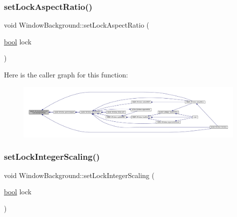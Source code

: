 \subsubsection{\texorpdfstring{set\+Lock\+Aspect\+Ratio()}{setLockAspectRatio()}}
{\footnotesize\ttfamily void Window\+Background\+::set\+Lock\+Aspect\+Ratio (\begin{DoxyParamCaption}\item[{\mbox{\hyperlink{libretro_8h_a4a26dcae73fb7e1528214a068aca317e}{bool}}}]{lock }\end{DoxyParamCaption})}

Here is the caller graph for this function\+:
\nopagebreak
\begin{figure}[H]
\begin{center}
\leavevmode
\includegraphics[width=350pt]{class_q_g_b_a_1_1_window_background_ae59914eea83da70457ef3a16cc954898_icgraph}
\end{center}
\end{figure}
\mbox{\label{class_q_g_b_a_1_1_window_background_a53952d8416bfb418c1c44bb46379ce92}} 
\subsubsection{\texorpdfstring{set\+Lock\+Integer\+Scaling()}{setLockIntegerScaling()}}
{\footnotesize\ttfamily void Window\+Background\+::set\+Lock\+Integer\+Scaling (\begin{DoxyParamCaption}\item[{\mbox{\hyperlink{libretro_8h_a4a26dcae73fb7e1528214a068aca317e}{bool}}}]{lock }\end{DoxyParamCaption})}

